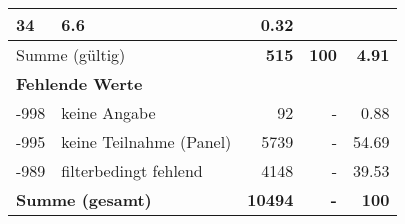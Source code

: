 \begin{longtable}{lXrrr}
       \num{34} &
       \num[round-mode=places,round-precision=2]{6.6} &
         \num[round-mode=places,round-precision=2]{0.32} \\
     \midrule
     \multicolumn{2}{l}{Summe (gültig)} &
       \textbf{\num{515}} &
     \textbf{\num{100}} &
       \textbf{\num[round-mode=places,round-precision=2]{4.91}} \\
     \multicolumn{5}{l}{\textbf{Fehlende Werte}}\\
       -998 &
       keine Angabe &
         \num{92} &
        - &
         \num[round-mode=places,round-precision=2]{0.88} \\
       -995 &
       keine Teilnahme (Panel) &
         \num{5739} &
        - &
         \num[round-mode=places,round-precision=2]{54.69} \\
       -989 &
       filterbedingt fehlend &
         \num{4148} &
        - &
         \num[round-mode=places,round-precision=2]{39.53} \\
     \midrule
     \multicolumn{2}{l}{\textbf{Summe (gesamt)}} &
          \textbf{\num{10494}} &
        \textbf{-} &
        \textbf{\num{100}} \\
     \bottomrule
     \end{longtable}
     

